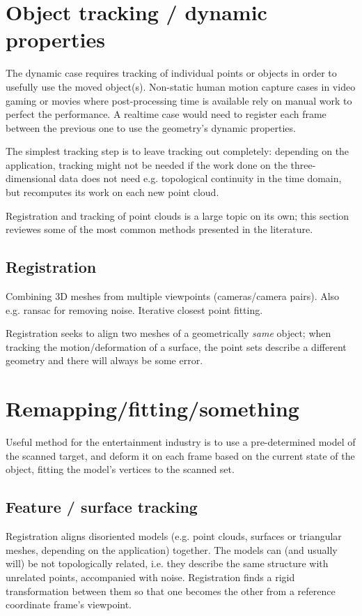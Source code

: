 \section{Object tracking / dynamic properties}

The dynamic case requires tracking of individual points or objects in order to usefully use the moved object(s). Non-static human motion capture cases in video gaming or movies where post-processing time is available rely on manual work to perfect the performance. A realtime case would need to register each frame between the previous one to use the geometry's dynamic properties.

The simplest tracking step is to leave tracking out completely: depending on the application, tracking might not be needed if the work done on the three-dimensional data does not need e.g. topological continuity in the time domain, but recomputes its work on each new point cloud.

Registration and tracking of point clouds is a large topic on its own; this section reviewes some of the most common methods presented in the literature.

\subsection{Registration}

Combining 3D meshes from multiple viewpoints (cameras/camera pairs). Also e.g. ransac for removing noise. Iterative closest point fitting.

Registration seeks to align two meshes of a geometrically \textit{same} object; when tracking the motion/deformation of a surface, the point sets describe a different geometry and there will always be some error.

\section{Remapping/fitting/something}

Useful method for the entertainment industry is to use a pre-determined model of the scanned target, and deform it on each frame based on the current state of the object, fitting the model's vertices to the scanned set.

\subsection{Feature / surface tracking}

Registration aligns disoriented models (e.g. point clouds, surfaces or triangular meshes, depending on the application) together. The models can (and usually will) be not topologically related, i.e. they describe the same structure with unrelated points, accompanied with noise. Registration finds a rigid transformation between them so that one becomes the other from a reference coordinate frame's viewpoint.

